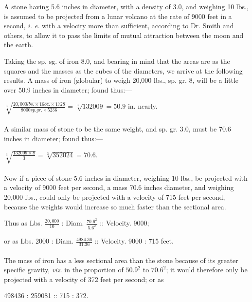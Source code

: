 \documentclass[a4paper, 12pt, oneside]{article}
\begin{document}
A stone having 5.6 inches in diameter, with a density of 3.0, and weighing 10 lbs., is assumed to be projected from a lunar volcano at the rate of 9000 feet in a second, \emph{i. e.} with a velocity more than sufficient, according to Dr. Smith and others, to allow it to pass the limits of mutual attraction between the moon and the earth.

Taking the sp. sg. of iron 8.0, and bearing in mind that the areas are as the squares and the masses as the cubes of the diameters, we arrive at the following results. A mass of iron (globular) to weigh 20,000 lbs., sp. gr. 8, will be a little over 50.9 inches in diameter; found thus:---
\begin{center}
$ \sqrt[3]{ \frac{20,000 lbs. \times 16 oz. \times 1728}{8000 sp. gr. \times 5236} } = \sqrt[3]{ 132009 } = 50.9 $ in. nearly.
\end{center}
\paragraph{}
A similar mass of stone to be the same weight, and sp. gr. 3.0, must be 70.6 inches in diameter; found thus:---
\begin{center}
$ \sqrt[3]{ \frac{132009 \times 8}{3} } = \sqrt[3]{ 352024 } = 70.6. $
\end{center}
\paragraph{}
Now if a piece of stone 5.6 inches in diameter, weighing 10 lbs., be projected with a velocity of 9000 feet per second, a mass 70.6 inches diameter, and weighing 20,000 lbs., could only be projected with a velocity of 715 feet per second, because the weights would increase so much faster than the sectional area.
\begin{center}
Thus as Lbs. $\frac{20,000}{10}$ : Diam. $\frac{70.6^2}{5.6^2}$ :: Velocity. 9000;
\end{center}

\begin{center}
or as Lbs. 2000 : Diam. $\frac{4984.36}{31.36 }$ :: Velocity. 9000 : 715 feet.
\end{center}
\paragraph{}
The mass of iron has a less sectional area than the stone because of its greater specific gravity, \emph{viz.} in the proportion of $50.9^2$ to $70.6^2$; it would therefore only be projected with a velocity of 372 feet per second; or as
\begin{center}
498436 : 259081 :: 715 : 372.
\end{center}
\end{document}
